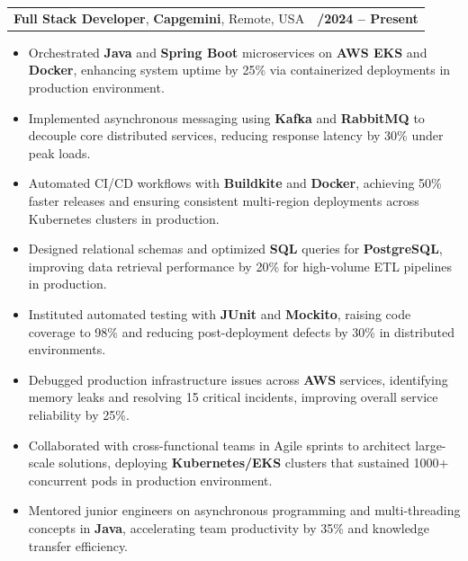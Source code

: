 \documentclass[letterpaper,11pt]{article}
\makeatletter
\newcommand{\resumeItem}[1]{
  \item\footnotesize{
    {#1 \vspace{-2pt}}
  }
}
\newcommand{\resumeSubheading}[4]{
  \vspace{-2pt}\item
    \begin{tabular*}{1.0\textwidth}[t]{l@{\extracolsep{\fill}}r}
      \textbf{\fontsize{10pt}{14pt}\selectfont #3}, \textbf{\fontsize{10pt}{14pt}\selectfont #1}, \fontsize{10pt}{14pt}\selectfont #4 & \textbf{\fontsize{10pt}{14pt}\selectfont #2} \\
    \end{tabular*}\vspace{-7pt}
}
\newcommand{\resumeItemListStart}{\begin{itemize}[leftmargin=*]}
\newcommand{\resumeItemListEnd}{\end{itemize}\vspace{-5pt}}
\makeatother
\begin{document}
    \resumeSubheading
        {Capgemini}{01/2024 -- Present}
        {Full Stack Developer}{Remote, USA}
      \resumeItemListStart
        \resumeItem{Orchestrated \textbf{Java} and \textbf{Spring Boot} microservices on \textbf{AWS EKS} and \textbf{Docker}, enhancing system uptime by 25\% via containerized deployments in production environment.}
        \resumeItem{Implemented asynchronous messaging using \textbf{Kafka} and \textbf{RabbitMQ} to decouple core distributed services, reducing response latency by 30\% under peak loads.}
        \resumeItem{Automated CI/CD workflows with \textbf{Buildkite} and \textbf{Docker}, achieving 50\% faster releases and ensuring consistent multi-region deployments across Kubernetes clusters in production.}
        \resumeItem{Designed relational schemas and optimized \textbf{SQL} queries for \textbf{PostgreSQL}, improving data retrieval performance by 20\% for high-volume ETL pipelines in production.}
        \resumeItem{Instituted automated testing with \textbf{JUnit} and \textbf{Mockito}, raising code coverage to 98\% and reducing post-deployment defects by 30\% in distributed environments.}
        \resumeItem{Debugged production infrastructure issues across \textbf{AWS} services, identifying memory leaks and resolving 15 critical incidents, improving overall service reliability by 25\%.}
        \resumeItem{Collaborated with cross-functional teams in Agile sprints to architect large-scale solutions, deploying \textbf{Kubernetes/EKS} clusters that sustained 1000+ concurrent pods in production environment.}
        \resumeItem{Mentored junior engineers on asynchronous programming and multi-threading concepts in \textbf{Java}, accelerating team productivity by 35\% and knowledge transfer efficiency.}
      \resumeItemListEnd
\end{document}
